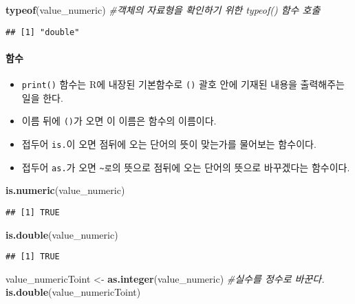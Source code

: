 \documentclass[
]{article}
\newenvironment{Shaded}{\begin{snugshade}}{\end{snugshade}}
\newcommand{\CommentTok}[1]{\textcolor[rgb]{0.56,0.35,0.01}{\textit{#1}}}
\newcommand{\FunctionTok}[1]{\textcolor[rgb]{0.13,0.29,0.53}{\textbf{#1}}}
\newcommand{\NormalTok}[1]{#1}
\newcommand{\OtherTok}[1]{\textcolor[rgb]{0.56,0.35,0.01}{#1}}
\providecommand{\tightlist}{%
  \setlength{\itemsep}{0pt}\setlength{\parskip}{0pt}}
\begin{document}
\begin{Shaded}
\begin{Highlighting}[]
\FunctionTok{typeof}\NormalTok{(value\_numeric) }\CommentTok{\#객체의 자료형을 확인하기 위한 typeof() 함수 호출}
\end{Highlighting}
\end{Shaded}

\begin{verbatim}
## [1] "double"
\end{verbatim}

\hypertarget{uxd568uxc218}{%
\paragraph{함수}\label{uxd568uxc218}}

\begin{itemize}
\tightlist
\item
  \texttt{print()} 함수는 R에 내장된 기본함수로 \texttt{()} 괄호 안에
  기재된 내용을 출력해주는 일을 한다.
\item
  이름 뒤에 \texttt{()}가 오면 이 이름은 함수의 이름이다.
\item
  접두어 \texttt{is.}이 오면 점뒤에 오는 단어의 뜻이 맞는가를 물어보는
  함수이다.
\item
  접두어 \texttt{as.}가 오면 \texttt{\textasciitilde{}로}의 뜻으로
  점뒤에 오는 단어의 뜻으로 바꾸겠다는 함수이다.
\end{itemize}

\begin{Shaded}
\begin{Highlighting}[]
\FunctionTok{is.numeric}\NormalTok{(value\_numeric)}
\end{Highlighting}
\end{Shaded}

\begin{verbatim}
## [1] TRUE
\end{verbatim}

\begin{Shaded}
\begin{Highlighting}[]
\FunctionTok{is.double}\NormalTok{(value\_numeric)}
\end{Highlighting}
\end{Shaded}

\begin{verbatim}
## [1] TRUE
\end{verbatim}

\begin{Shaded}
\begin{Highlighting}[]
\NormalTok{value\_numericToint }\OtherTok{\textless{}{-}} \FunctionTok{as.integer}\NormalTok{(value\_numeric) }\CommentTok{\#실수를 정수로 바꾼다.}
\FunctionTok{is.double}\NormalTok{(value\_numericToint)}
\end{Highlighting}
\end{Shaded}
\end{document}
